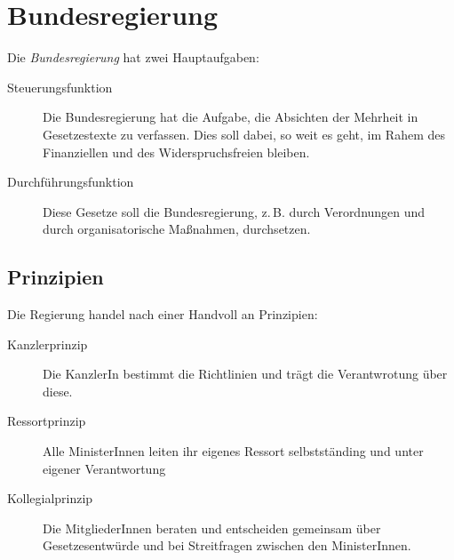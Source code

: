 \documentclass{article}
\begin{document}
\section{Bundesregierung}
Die \emph{Bundesregierung} hat zwei Hauptaufgaben:
\begin{description}
 \item[Steuerungsfunktion] Die Bundesregierung hat die Aufgabe, die Absichten der Mehrheit in Gesetzestexte zu verfassen. Dies soll dabei, so weit es geht, im Rahem des Finanziellen und des Widerspruchsfreien bleiben.
 \item[Durchführungsfunktion] Diese Gesetze soll die Bundesregierung, z.\,B. durch Verordnungen und durch organisatorische Maßnahmen, durchsetzen. 
\end{description} 
 
\subsection{Prinzipien}
Die Regierung handel nach einer Handvoll an Prinzipien:
\begin{description}
 \item[Kanzlerprinzip] Die KanzlerIn bestimmt die Richtlinien und trägt die Verantwrotung über diese.
 \item[Ressortprinzip] Alle MinisterInnen leiten ihr eigenes Ressort selbstständing und unter eigener Verantwortung
 \item[Kollegialprinzip] Die MitgliederInnen beraten und entscheiden gemeinsam über Gesetzesentwürde und bei Streitfragen zwischen den MinisterInnen. 
\end{description} 
\end{document}
